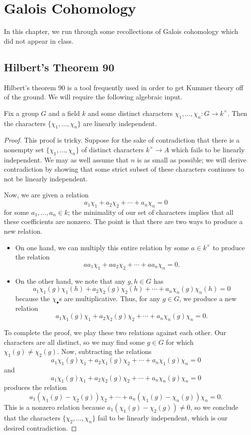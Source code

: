 \documentclass[notes.tex]{subfiles}
\begin{document}
\chapter{Galois Cohomology}

In this chapter, we run through some recollections of Galois cohomology which did not appear in class.

\section{Hilbert's Theorem 90}
Hilbert's theorem 90 is a tool frequently used in order to get Kummer theory off of the ground. We will require the following algebraic input.
\begin{proposition}[Dedekind] \label{prop:dedekind-linear-ind}
	Fix a group $G$ and a field $k$ and some distinct characters $\chi_1,\ldots,\chi_n\colon G\to k^\times$. Then the characters $\{\chi_1,\ldots,\chi_n\}$ are linearly independent.
\end{proposition}
\begin{proof}
	This proof is tricky. Suppose for the sake of contradiction that there is a nonempty set $\{\chi_1,\ldots,\chi_n\}$ of distinct characters $k^\times\to A$ which fails to be linearly independent. We may as well assume that $n$ is as small as possible; we will derive contradiction by showing that some strict subset of these characters continues to not be linearly independent.

	Now, we are given a relation
	\[a_1\chi_1+a_2\chi_2+\cdots+a_n\chi_n=0\]
	for some $a_1,\ldots,a_n\in k$; the minimality of our set of characters implies that all these coefficients are nonzero. The point is that there are two ways to produce a new relation.
	\begin{itemize}
		\item On one hand, we can multiply this entire relation by some $a\in k^\times$ to produce the relation
		\[aa_1\chi_1+aa_2\chi_2+\cdots+aa_n\chi_n=0.\]
		\item On the other hand, we note that any $g,h\in G$ has
		\[a_1\chi_1(g)\chi_1(h)+a_2\chi_2(g)\chi_2(h)+\cdots+a_n\chi_n(g)\chi_n(h)=0\]
		because the $\chi_\bullet$s are multiplicative. Thus, for any $g\in G$, we produce a new relation
		\[a_1\chi_1(g)\chi_1+a_2\chi_2(g)\chi_2+\cdots+a_n\chi_n(g)\chi_n=0.\]
	\end{itemize}
	To complete the proof, we play these two relations against each other. Our characters are all distinct, so we may find some $g\in G$ for which $\chi_1(g)\ne\chi_2(g)$. Now, subtracting the relations
	\[a_1\chi_1(g)\chi_1+a_2\chi_1(g)\chi_2+\cdots+a_n\chi_1(g)\chi_n=0\]
	and
	\[a_1\chi_1(g)\chi_1+a_2\chi_2(g)\chi_2+\cdots+a_n\chi_n(g)\chi_n=0\]
	produces the relation
	\[a_1(\chi_1(g)-\chi_2(g))\chi_2+\cdots+a_n(\chi_1(g)-\chi_n(g))\chi_n=0.\]
	This is a nonzero relation because $a_1(\chi_1(g)-\chi_2(g))\ne0$, so we conclude that the characters $\{\chi_2,\ldots,\chi_n\}$ fail to be linearly independent, which is our desired contradiction.
\end{proof}
\end{document}
